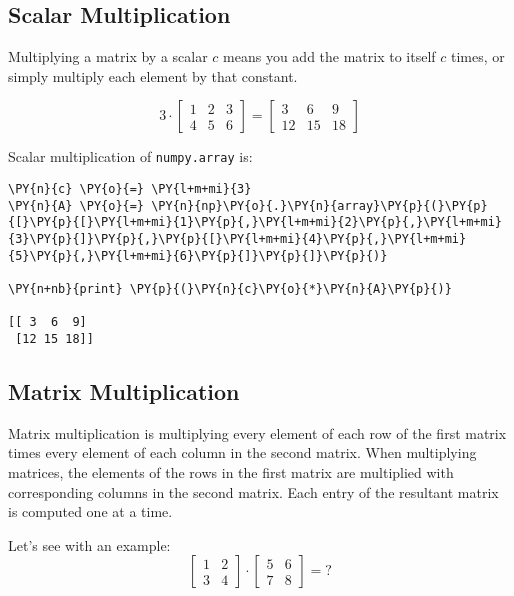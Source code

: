 \subsection{Scalar Multiplication}\label{scalar-multiplication}

Multiplying a matrix by a scalar \(c\) means you add the matrix to
itself \(c\) times, or simply multiply each element by that constant.

\[
3 \cdot
\begin{bmatrix}
1 & 2 & 3 \\
4 & 5 & 6
\end{bmatrix}
=
\begin{bmatrix}
3 & 6 & 9 \\
12 & 15 & 18
\end{bmatrix}
\]

Scalar multiplication of \texttt{numpy.array} is:

    \begin{tcolorbox}[breakable, size=fbox, boxrule=1pt, pad at break*=1mm,colback=cellbackground, colframe=cellborder]
\begin{Verbatim}[commandchars=\\\{\}]
\PY{n}{c} \PY{o}{=} \PY{l+m+mi}{3}
\PY{n}{A} \PY{o}{=} \PY{n}{np}\PY{o}{.}\PY{n}{array}\PY{p}{(}\PY{p}{[}\PY{p}{[}\PY{l+m+mi}{1}\PY{p}{,}\PY{l+m+mi}{2}\PY{p}{,}\PY{l+m+mi}{3}\PY{p}{]}\PY{p}{,}\PY{p}{[}\PY{l+m+mi}{4}\PY{p}{,}\PY{l+m+mi}{5}\PY{p}{,}\PY{l+m+mi}{6}\PY{p}{]}\PY{p}{]}\PY{p}{)}

\PY{n+nb}{print} \PY{p}{(}\PY{n}{c}\PY{o}{*}\PY{n}{A}\PY{p}{)}

[[ 3  6  9]
 [12 15 18]]
    \end{Verbatim}
\end{tcolorbox}

\subsection{Matrix Multiplication}\label{matrix-multiplication}

Matrix multiplication is multiplying every element of each row of the
first matrix times every element of each column in the second matrix.
When multiplying matrices, the elements of the rows in the first matrix
are multiplied with corresponding columns in the second matrix. Each
entry of the resultant matrix is computed one at a time.

Let's see with an example: \[ 
\begin{bmatrix}
1 & 2 \\
3 & 4
\end{bmatrix}
\cdot
\begin{bmatrix}
5 & 6 \\
7 & 8
\end{bmatrix}
= ?
\]

